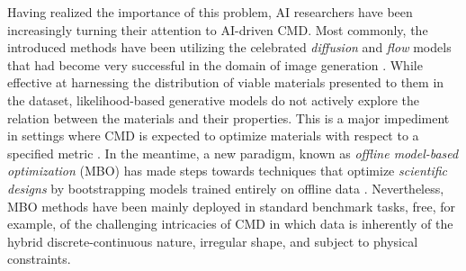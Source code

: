 \documentclass{article}
\theoremstyle{plain}
\theoremstyle{definition}
\theoremstyle{remark}
\begin{document}
Having realized the importance of this problem, AI researchers have been increasingly turning their attention to AI-driven CMD. 
Most commonly, the introduced methods have been utilizing the celebrated \emph{diffusion} and \emph{flow} models that had become very successful in the domain of image generation \citep{ho2020denoising, lipman2022flow, miller2024flowmm, inizangenerative}.
While effective at harnessing the distribution of viable materials presented to them in the dataset, likelihood-based generative models do not actively explore the relation between the materials and their properties.
This is a major impediment in settings where CMD is expected to optimize materials with respect to a specified metric \citep{yang2024generative, havens2025adjoint}.
In the meantime, a new paradigm, known as \emph{offline model-based optimization} (MBO) has made steps towards techniques that optimize \emph{scientific designs} by bootstrapping models trained entirely on offline data \citep{kumar2021data, trabucco2022design, kuba2024cliqueformer}. 
Nevertheless, MBO methods have been mainly deployed in standard benchmark tasks, free, for example, of the challenging intricacies of CMD in which data is inherently of the hybrid discrete-continuous nature, irregular shape, and subject to physical constraints.
\end{document}
